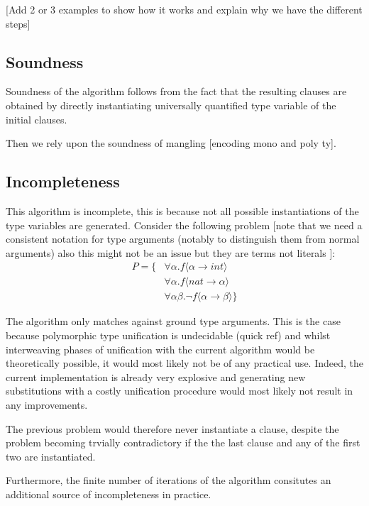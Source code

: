 \documentclass{article}
\begin{document}
[Add 2 or 3 examples to show how it works and explain why we have the different steps]

\subsection{Soundness}
Soundness of the algorithm follows from the fact that the resulting clauses are obtained by directly instantiating universally quantified type variable of the initial clauses.

Then we rely upon the soundness of mangling [encoding mono and poly ty].

\subsection{Incompleteness}

This algorithm is incomplete, this is because not all possible instantiations of the type variables are generated.
Consider the following problem [note that we need a consistent notation for type arguments (notably to distinguish them from normal arguments) also this might not be an issue but they are terms not literals ]: 
\begin{align*}
   P = \{ & \forall \alpha. f \langle \alpha \rightarrow int \rangle \\
          & \forall \alpha. f \langle nat \rightarrow \alpha \rangle \\
          & \forall \alpha \beta. \lnot f \langle \alpha \rightarrow \beta \rangle \}
\end{align*}

The algorithm only matches against ground type arguments. This is the case because polymorphic type unification is undecidable (quick ref) and whilst interweaving phases of unification with the current algorithm would be theoretically possible, it would most likely not be of any practical use. Indeed, the current implementation is already very explosive and generating new substitutions with a costly unification procedure would most likely not result in any improvements.


The previous problem would therefore never instantiate a clause, despite the problem becoming trvially contradictory if the the last clause and any of the first two are instantiated.


Furthermore, the finite number of iterations of the algorithm consitutes an additional source of incompleteness in practice.
\end{document}
